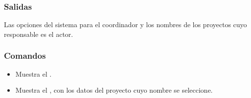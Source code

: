 \subsubsection{Salidas}
Las opciones del sistema para el coordinador y los nombres de los proyectos cuyo responsable es el actor.

\subsubsection{Comandos}
\begin{itemize}
\item {} Muestra el .
\item {} Muestra el , con los datos del proyecto cuyo nombre se seleccione.
\end{itemize}